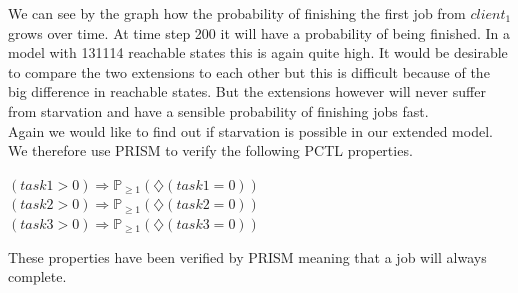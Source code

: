 \documentclass[12pt]{report}
\begin{document}
We can see by the graph how the probability of finishing the first job from $client_1$ grows over time. At time step 200 it will have a probability of being finished. In a model with 131114 reachable states this is again quite high. It would be desirable to compare the two extensions to each other but this is difficult because of the big difference in reachable states. But the extensions however will never suffer from starvation and have a sensible probability of finishing jobs fast.
\\Again we would like to find out if starvation is possible in our extended model. We therefore use PRISM to verify the following PCTL properties.
\begin{center}
$(task1 > 0) \Rightarrow \mathbb{P}_{\geq 1}(\diamondsuit(task1 = 0))$\\
$(task2 > 0) \Rightarrow \mathbb{P}_{\geq 1}(\diamondsuit(task2 = 0))$\\
$(task3 > 0) \Rightarrow \mathbb{P}_{\geq 1}(\diamondsuit(task3 = 0))$
\end{center}
These properties have been verified by PRISM meaning that a job will always complete.
\end{document}
